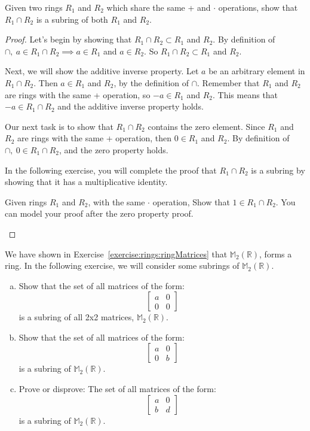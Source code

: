 \begin{example}{}
Given two rings $R_1$ and $R_2$ which share the same + and $\cdot$ operations, show that $R_1 \cap R_2$ is a subring of both $R_1$ and $R_2$.

\begin{proof}
Let's begin by showing that $R_1 \cap R_2\subset R_1$ and $R_2$.  By definition of $\cap, ~a\in R_1\cap R_2\implies a\in R_1$ and $a\in R_2$. So  $R_1 \cap R_2\subset R_1$ and $R_2$. 

Next, we will show the additive inverse property. Let $a$ be an arbitrary element in $R_1 \cap R_2$. Then $a\in R_1$ and $R_2$, by the definition of $\cap$. Remember that $R_1$ and $R_2$ are rings with the same + operation, so $-a\in R_1$ and $R_2$.  This means that $-a\in R_1 \cap R_2$ and the additive inverse property holds.

Our next task is to show that $R_1 \cap R_2$ contains the zero element. Since $R_1$ and $R_2$ are rings with the same + operation, then $0\in R_1$ and $R_2$.  By definition of $\cap, ~0\in R_1 \cap R_2$, and the zero property holds.

In the following exercise, you will complete the proof that $R_1\cap R_2$ is a subring by showing that it has a multiplicative identity.

\begin{exercise}{}
Given rings $R_1$ and $R_2$, with the same $\cdot$ operation, Show that $1\in R_1 \cap R_2$. You can model your proof after the zero property proof.
\end{exercise}
\end{proof}
\end{example}
We have shown in Exercise~\ref{exercise:rings:ringMatrices} that ${\mathbb M}_2({\mathbb R})$, forms a ring.  In the following exercise, we will consider some subrings of ${\mathbb M}_2({\mathbb R})$.


\begin{exercise}{}
\begin{enumerate}[(a)]
\item
Show that the set of all matrices of the form:
$$
\begin{bmatrix}
a & 0\\
0 & 0
\end{bmatrix}
$$
is a subring of all 2x2 matrices, ${\mathbb M}_2({\mathbb R})$.
\item
Show that the set of all matrices of the form:
$$
\begin{bmatrix}
a & 0\\
0 & b
\end{bmatrix}
$$
is a subring of ${\mathbb M}_2({\mathbb R})$.
\item
Prove or disprove: The set of all matrices of the form:
$$
\begin{bmatrix}
a & 0\\
b & d
\end{bmatrix}
$$
is a subring of  ${\mathbb M}_2({\mathbb R})$.
\end{enumerate}
\end{exercise}

